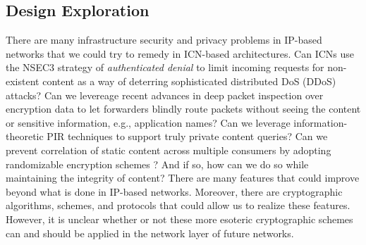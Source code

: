 \subsection{Design Exploration}
There are many infrastructure security and privacy problems in IP-based networks that we could try to remedy in ICN-based architectures.
Can ICNs use the NSEC3 strategy of \emph{authenticated denial} \cite{blacka2008dns} to limit incoming requests
for non-existent content as a way of deterring sophisticated distributed DoS (DDoS) attacks?
Can we levereage recent advances in deep packet inspection over encryption data \cite{sherry2015blindbox}
to let forwarders blindly route packets without seeing the content or sensitive information,
e.g., application names? Can we leverage information-theoretic PIR techniques \cite{pir-icn} to support
truly private content queries? Can we prevent correlation
of static content across multiple consumers by adopting randomizable encryption schemes \cite{blazy2011signatures}?
And if so, how can we do so while maintaining the integrity of content? There are many
features that could improve beyond what is done in IP-based networks. Moreover, there are cryptographic
algorithms, schemes, and protocols that could allow us to realize these features. However,
it is unclear whether or not these more esoteric cryptographic schemes can and should be applied in
the network layer of future networks.
